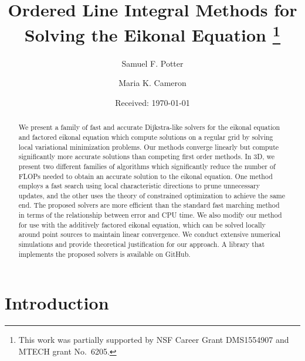 \documentclass[smallcondensed]{svjour3}
\begin{document}
\title{
  Ordered Line Integral Methods for Solving the Eikonal Equation
  \footnote{This work was partially supported by NSF Career Grant
    DMS1554907 and MTECH grant No.\ 6205.}
}

\author{Samuel F. Potter \and Maria K. Cameron}


\date{Received: \today}

\maketitle

\begin{abstract}
  We present a family of fast and accurate Dijkstra-like solvers for
  the eikonal equation and factored eikonal equation which compute
  solutions on a regular grid by solving local variational
  minimization problems. Our methods converge linearly but compute
  significantly more accurate solutions than competing first order
  methods. In 3D, we present two different families
  of algorithms which significantly reduce the number of FLOPs needed
  to obtain an accurate solution to the eikonal equation. One method
  employs a fast search using local characteristic directions to prune
  unnecessary updates, and the other uses the theory of constrained
  optimization to achieve the same end. The proposed solvers are more
  efficient than the standard fast marching method in terms of the
  relationship between error and CPU time. We also modify our method
  for use with the additively factored eikonal equation, which can be
  solved locally around point sources to maintain linear
  convergence. We conduct extensive numerical simulations and provide
  theoretical justification for our approach. A library that
  implements the proposed solvers is available on GitHub.
   
\end{abstract}

\section{Introduction}\label{sec:introduction}
\end{document}
